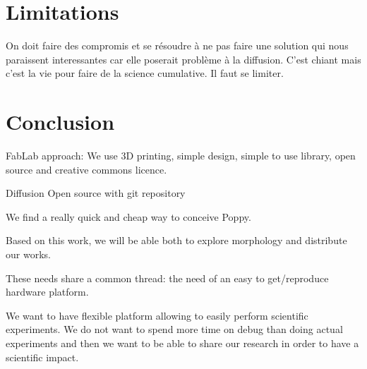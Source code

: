 \section{Limitations} %

On doit faire des compromis et se résoudre à ne pas faire une solution qui  nous paraissent interessantes car elle poserait problème à la diffusion.
C'est chiant mais c'est la vie pour faire de la science cumulative.
Il faut se limiter.


\section{Conclusion} %

FabLab approach: We use 3D printing, simple design, simple to use library, open source and creative commons licence.

Diffusion Open source with git repository

We find a really quick and cheap way to conceive Poppy.

Based on this work, we will be able both to explore morphology and distribute our works.

These needs share a common thread: the need of an easy to get/reproduce hardware platform.

We want to have flexible platform allowing to easily perform scientific experiments.
We do not want to spend more time on debug than doing actual experiments and then we want to be able to share our research in order to have a scientific impact.



